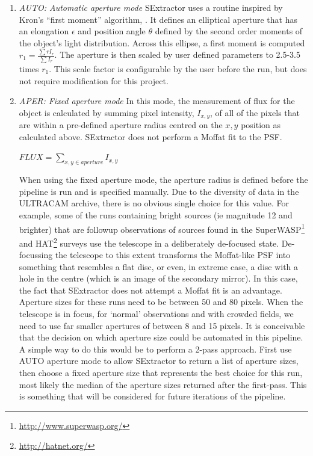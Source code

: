 \begin{enumerate}
  \item \emph{AUTO: Automatic aperture mode}
SExtractor uses a routine inspired by Kron's ``first moment'' algorithm, \citep{kron}. It defines an elliptical aperture that has an elongation $\epsilon$ and position angle $\theta$ defined by the second order moments of the object's light distribution. Across this ellipse, a first moment is computed $r_1 = \frac{\sum r I_r}{\sum{I_r}}$. The aperture is then scaled by user defined parameters to 2.5-3.5 times $r_1$. This scale factor is configurable by the user before the run, but does not require modification for this project. 

  \item \emph{APER: Fixed aperture mode}
In this mode, the measurement of flux for the object is calculated by summing pixel intensity, $I_{x,y}$,  of all of the pixels that are within a pre-defined aperture radius centred on the $x, y$ position as calculated above. SExtractor does not perform a Moffat fit to the PSF. 

$FLUX = \sum\limits_{x,y \in aperture}I_{x,y} $

When using the fixed aperture mode, the aperture radius is defined before the pipeline is run and is specified  manually. Due to the diversity of data in the ULTRACAM archive, there is no obvious single choice for this value. For example, some of the runs containing bright sources (ie magnitude 12 and brighter) that are followup observations of sources found in the {SuperWASP}\footnote{\url{http://www.superwasp.org/}} and {HAT}\footnote{\url{http://hatnet.org/}} surveys use the telescope in a deliberately de-focused state. De-focussing the telescope to this extent transforms the Moffat-like PSF into something that resembles a flat disc, or even, in extreme case, a disc with a hole in the centre (which is an image of the secondary mirror). In this case, the fact that SExtractor does not attempt a Moffat fit is an advantage. Aperture sizes for these runs need to be between 50 and 80 pixels. When the telescope is in focus, for `normal' observations and with crowded fields, we need to use far smaller apertures of between 8 and 15 pixels. It is conceivable that the decision on which aperture size could be automated in this pipeline. A simple way to do this would be to perform a 2-pass approach. First use AUTO aperture mode to allow SExtractor to return a list of aperture sizes, then choose a fixed aperture size that represents the best choice for this run, most likely the median of the aperture sizes returned after the first-pass. This is something that will be considered for future iterations of the pipeline. 


\end{enumerate}
